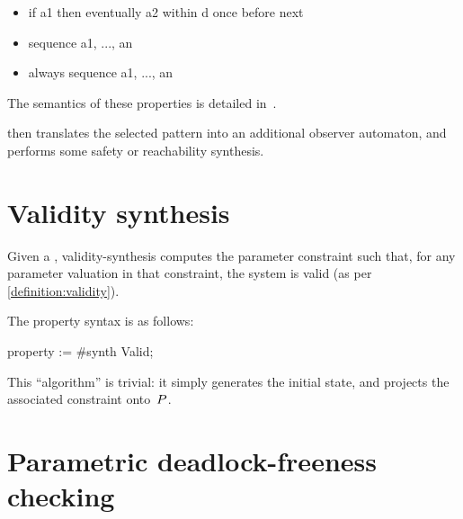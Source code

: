 \begin{itemize}
	\item
\begin{IMITATORproperty}
if a1 then eventually a2 within d once before next
\end{IMITATORproperty}

	\item
\begin{IMITATORproperty}
sequence a1, ..., an
\end{IMITATORproperty}

	\item
\begin{IMITATORproperty}
always sequence a1, ..., an
\end{IMITATORproperty}

\end{itemize}

The semantics of these properties is detailed in~\cite{Andre13ICECCS}.

\imitator{} then translates the selected pattern into an additional observer automaton, and performs some safety or reachability synthesis.


\section{Validity synthesis}\label{ss:mode:validity}

Given a \NIPTA{}, validity-synthesis computes the parameter constraint such that, for any parameter valuation in that constraint, the system is valid (as per \cref{definition:validity}).

The property syntax is as follows:

\begin{IMITATORproperty}
property := #synth Valid;
\end{IMITATORproperty}

This ``algorithm'' is trivial: it simply generates the initial state, and projects the associated constraint onto~$P$.



\section{Parametric deadlock-freeness checking}\label{ss:mode:PDFC}

